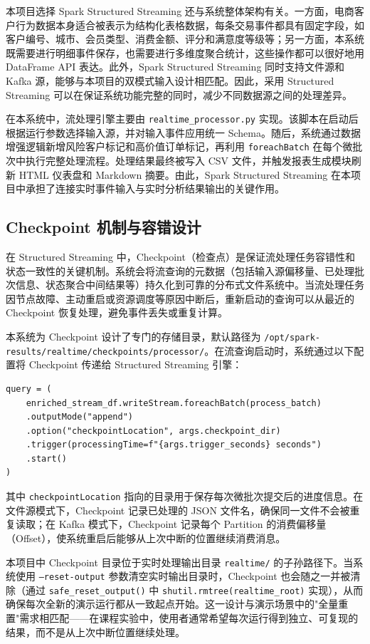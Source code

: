 \documentclass[12pt,hyperref,a4paper,UTF8]{ctexart}
\begin{document}
本项目选择 Spark Structured Streaming 还与系统整体架构有关。一方面，电商客户行为数据本身适合被表示为结构化表格数据，每条交易事件都具有固定字段，如客户编号、城市、会员类型、消费金额、评分和满意度等级等；另一方面，本系统既需要进行明细事件保存，也需要进行多维度聚合统计，这些操作都可以很好地用 DataFrame API 表达。此外，Spark Structured Streaming 同时支持文件源和 Kafka 源，能够与本项目的双模式输入设计相匹配。因此，采用 Structured Streaming 可以在保证系统功能完整的同时，减少不同数据源之间的处理差异。

在本系统中，流处理引擎主要由 \texttt{realtime\_processor.py} 实现。该脚本在启动后根据运行参数选择输入源，并对输入事件应用统一 Schema。随后，系统通过数据增强逻辑新增风险客户标记和高价值订单标记，再利用 \texttt{foreachBatch} 在每个微批次中执行完整处理流程。处理结果最终被写入 CSV 文件，并触发报表生成模块刷新 HTML 仪表盘和 Markdown 摘要。由此，Spark Structured Streaming 在本项目中承担了连接实时事件输入与实时分析结果输出的关键作用。

\subsection{Checkpoint 机制与容错设计}

在 Structured Streaming 中，Checkpoint（检查点）是保证流处理任务容错性和状态一致性的关键机制。系统会将流查询的元数据（包括输入源偏移量、已处理批次信息、状态聚合中间结果等）持久化到可靠的分布式文件系统中。当流处理任务因节点故障、主动重启或资源调度等原因中断后，重新启动的查询可以从最近的 Checkpoint 恢复处理，避免事件丢失或重复计算。

本系统为 Checkpoint 设计了专门的存储目录，默认路径为 \texttt{/opt/spark-results/realtime/checkpoints/processor/}。在流查询启动时，系统通过以下配置将 Checkpoint 传递给 Structured Streaming 引擎：

\begin{verbatim}
query = (
    enriched_stream_df.writeStream.foreachBatch(process_batch)
    .outputMode("append")
    .option("checkpointLocation", args.checkpoint_dir)
    .trigger(processingTime=f"{args.trigger_seconds} seconds")
    .start()
)
\end{verbatim}

其中 \texttt{checkpointLocation} 指向的目录用于保存每次微批次提交后的进度信息。在文件源模式下，Checkpoint 记录已处理的 JSON 文件名，确保同一文件不会被重复读取；在 Kafka 模式下，Checkpoint 记录每个 Partition 的消费偏移量（Offset），使系统重启后能够从上次中断的位置继续消费消息。

本项目中 Checkpoint 目录位于实时处理输出目录 \texttt{realtime/} 的子孙路径下。当系统使用 \texttt{--reset-output} 参数清空实时输出目录时，Checkpoint 也会随之一并被清除（通过 \texttt{safe\_reset\_output()} 中 \texttt{shutil.rmtree(realtime\_root)} 实现），从而确保每次全新的演示运行都从一致起点开始。这一设计与演示场景中的"全量重置"需求相匹配——在课程实验中，使用者通常希望每次运行得到独立、可复现的结果，而不是从上次中断位置继续处理。
\end{document}
